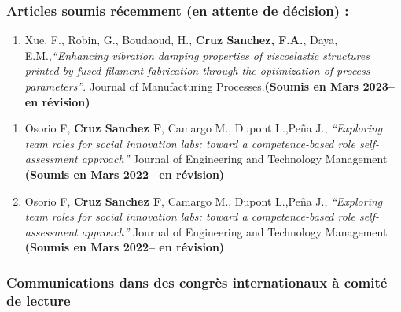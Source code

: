 \documentclass[
  11pt,
]{article}
\providecommand{\tightlist}{%
  \setlength{\itemsep}{0pt}\setlength{\parskip}{0pt}}\usepackage{longtable,booktabs,array}
\begin{document}
\hypertarget{articles-soumis-ruxe9cemment-en-attente-de-duxe9cision}{%
\subsubsection{Articles soumis récemment (en attente de décision)
:}\label{articles-soumis-ruxe9cemment-en-attente-de-duxe9cision}}

\begin{enumerate}
\def\labelenumi{\arabic{enumi}.}
\tightlist
\item
  Xue, F., Robin, G., Boudaoud, H., \textbf{Cruz Sanchez, F.A.}, Daya,
  E.M.,\emph{``Enhancing vibration damping properties of viscoelastic
  structures printed by fused filament fabrication through the
  optimization of process parameters''}. Journal of Manufacturing
  Processes.\textbf{(Soumis en Mars 2023-- en révision)}
\end{enumerate}

\begin{enumerate}
\def\labelenumi{\arabic{enumi}.}
\item
  Osorio F, \textbf{Cruz Sanchez F}, Camargo M., Dupont L.,Peña J.,
  \emph{``Exploring team roles for social innovation labs: toward a
  competence-based role self-assessment approach''} Journal of
  Engineering and Technology Management \textbf{(Soumis en Mars 2022--
  en révision)}
\item
  Osorio F, \textbf{Cruz Sanchez F}, Camargo M., Dupont L.,Peña J.,
  \emph{``Exploring team roles for social innovation labs: toward a
  competence-based role self-assessment approach''} Journal of
  Engineering and Technology Management \textbf{(Soumis en Mars 2022--
  en révision)}
\end{enumerate}

\hypertarget{communications-dans-des-congruxe8s-internationaux-uxe0-comituxe9-de-lecture}{%
\subsubsection{Communications dans des congrès internationaux à comité
de
lecture}\label{communications-dans-des-congruxe8s-internationaux-uxe0-comituxe9-de-lecture}}
\end{document}
